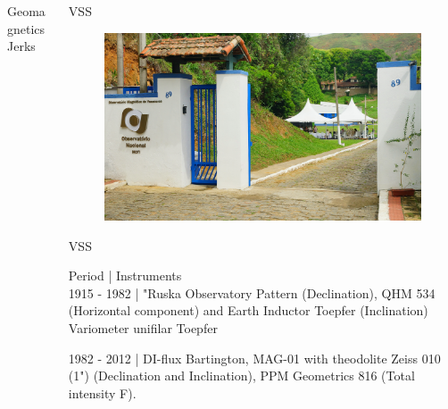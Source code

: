 \documentclass[final,t]{beamer}
\begin{document}
\begin{columns}[t]
\begin{column}{.66\linewidth}
\begin{columns}
\begin{column}{.31\linewidth}
\begin{block}{Geomagnetics Jerks}
		
		
		
		
		
	\end{block}
\end{column}	

\end{columns}

\end{column}
\begin{column}{.33\linewidth}


\begin{block}{VSS}
	\justifying
\begin{figure}
\centering
\includegraphics[width=0.8\linewidth]{OMV_JOELSONMOREIRA}
\caption{}
\label{fig:OMV_JOELSONMOREIRA}
\end{figure}





\end{block}


\begin{block}{VSS}
\centering

	 Period |\hspace{2.0cm}  Instruments   \\ 
	 
	 1915 - 1982 | "Ruska Observatory Pattern (Declination), QHM 534 (Horizontal component) and Earth Inductor Toepfer (Inclination) Variometer unifilar Toepfer 
	 
	 1982 - 2012 | DI-flux Bartington, MAG-01 with theodolite Zeiss 010 (1") (Declination and Inclination), PPM Geometrics 816 (Total intensity F).
	 

\end{block}
\end{column}
\end{columns}
\end{document}
